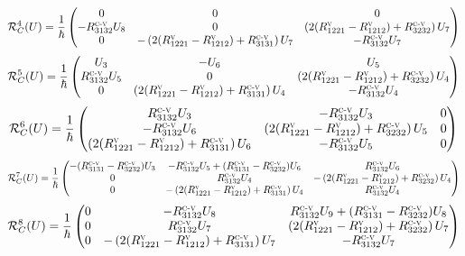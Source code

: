 \documentclass[a4paper]{article}
\begin{document}
\begin{itemize}
\[\mathcal{R}^{4}_{C}(U)= \dfrac{1}{\hbar}
\begin{pmatrix}
0 & 0 & 0 \\
-R^{\textsc{c-v}}_{3132}U_{8} & 0 & \left(2(R^{\textsc{v}}_{1221}-R^{\textsc{v}}_{1212})+R^{\textsc{c-v}}_{3232}\right)U_{7}\\
0 & -\left(2(R^{\textsc{v}}_{1221}-R^{\textsc{v}}_{1212})+R^{\textsc{c-v}}_{3131}\right)U_{7} & - R^{\textsc{c-v}}_{3132} U_{7}
\end{pmatrix}\]
\[\mathcal{R}^{5}_{C}(U) = \dfrac{1}{\hbar}
\begin{pmatrix}
U_{3} & -U_{6} & U_{5} \\
R^{\textsc{c-v}}_{3132}U_{5} & 0 & \left( 2(R^{\textsc{v}}_{1221}-R^{\textsc{v}}_{1212})+R^{\textsc{c-v}}_{3232}\right)U_{4}\\
0 & \left(2(R^{\textsc{v}}_{1221}-R^{\textsc{v}}_{1212})+R^{\textsc{c-v}}_{3131}\right)U_{4} & -R^{\textsc{c-v}}_{3132}U_{4}
\end{pmatrix}\]
\[\mathcal{R}^{6}_{C}(U)= \dfrac{1}{\hbar}
\begin{pmatrix}
R^{\textsc{c-v}}_{3132}U_{3} & -R^{\textsc{c-v}}_{3132}U_{3} & 0 \\
-R^{\textsc{c-v}}_{3132}U_{6} & \left(2(R^{\textsc{v}}_{1221}-R^{\textsc{v}}_{1212})+R^{\textsc{c-v}}_{3232}\right)U_{5} & 0 \\
\left(2(R^{\textsc{v}}_{1221}-R^{\textsc{v}}_{1212})+R^{\textsc{c-v}}_{3131}\right)U_{6} & -R^{\textsc{c-v}}_{3132}U_{5} & 0 
\end{pmatrix}\]
\[\mathcal{R}^{7}_{C}(U)= \dfrac{1}{\hbar}
\begin{pmatrix}
-(R^{\textsc{c-v}}_{3131}-R^{\textsc{c-v}}_{3232})U_{3} & -R^{\textsc{c-v}}_{3132}U_{5}+(R^{\textsc{c-v}}_{3131}-R^{\textsc{c-v}}_{3232})U_{6} &  R^{\textsc{c-v}}_{3132}U_{6}\\
0& R^{\textsc{c-v}}_{3132}U_{4} & -\left(2(R^{\textsc{v}}_{1221}-R^{\textsc{v}}_{1212})+R^{\textsc{c-v}}_{3232}\right)U_{4}\\
0 & -\left(2(R^{\textsc{v}}_{1221}-R^{\textsc{v}}_{1212})+R^{\textsc{c-v}}_{3131}\right)U_{4} & R^{\textsc{c-v}}_{3132}U_{4} 
\end{pmatrix}\]
\[\mathcal{R}^{8}_{C}(U) = \dfrac{1}{\hbar}
\begin{pmatrix}
0 & -R^{\textsc{c-v}}_{3132}U_{8} & R^{\textsc{c-v}}_{3132}U_{9}+(R^{\textsc{c-v}}_{3131}-R^{\textsc{c-v}}_{3232})U_{8}\\
0 & R^{\textsc{c-v}}_{3132}U_{7} &  \left( 2(R^{\textsc{v}}_{1221}-R^{\textsc{v}}_{1212})+R^{\textsc{c-v}}_{3232}\right)U_{7}\\
0 & -\left(2(R^{\textsc{v}}_{1221}-R^{\textsc{v}}_{1212})+R^{\textsc{c-v}}_{3131}\right)U_{7} & -R^{\textsc{c-v}}_{3132}U_{7}
\end{pmatrix}\]


\end{itemize}
\end{document}
